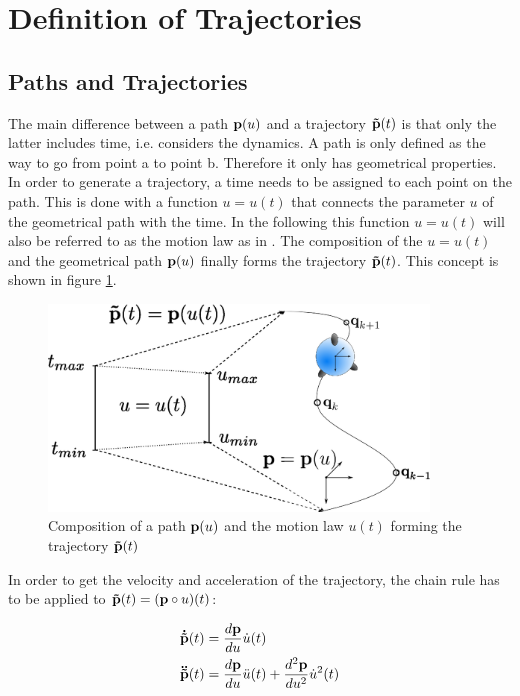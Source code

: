 \section{Definition of Trajectories}
\label{sec:definition}
\subsection{Paths and Trajectories}
The main difference between a path $ {\bf p}(u)$ and a trajectory $ {\bf \tilde{p}}(t)$ is that only the latter includes time, i.e. considers the dynamics. A path is only defined as the way to go from point a to point b. Therefore it only has geometrical properties. In order to generate a trajectory, a time needs to be assigned to each point on the path. This is done with a function $u=u(t)$ that connects the parameter $u$ of the geometrical path with the time. In the following this function $u=u(t)$ will also be referred to as the motion law as in \cite{snider}. The composition of the $u=u(t)$ and the geometrical path ${\bf p}(u)$ finally forms the trajectory ${\bf \tilde{p}}(t)$. This concept is shown in figure \ref{fig:path_trajectory}.

\begin{figure}[H]
	\centering
    \includegraphics[width = 0.9\textwidth]{graphics/PathTrajectory.eps}
  \caption{Composition of a path ${\bf p}(u)$ and the motion law $u(t)$ forming the trajectory ${\bf \tilde{p}}(t)$}
  \label{fig:path_trajectory}
\end{figure}


In order to get the velocity and acceleration of the trajectory, the chain rule has to be applied to ${\bf \tilde{p}}(t)=({\bf p}\circ u)(t)$:

\begin{align}\label{vel_acc}
{\bf \dot{\tilde{p}}}(t) &= \frac{d {\bf p}}{du}\dot{u}(t) \\
{\bf \ddot{\tilde{p}}}(t) &= \frac{d {\bf p}}{du}\ddot{u}(t)+\frac{d^{2} {\bf p}}{du^{2}}\dot{u}^{2}(t)
\end{align}


